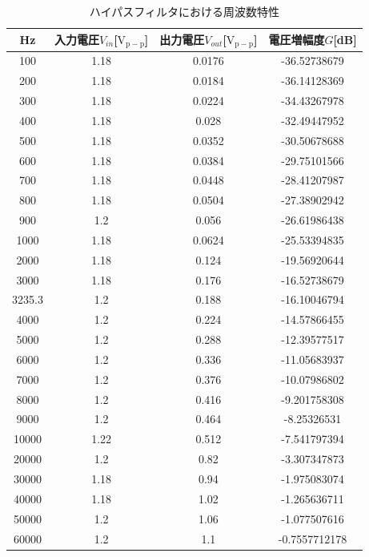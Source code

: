 \documentclass[a4paper,11pt,uplatex]{jsarticle}
\begin{document}
\begin{table}[H]
	\caption{ハイパスフィルタにおける周波数特性}
	\label{ハイパス特性}
	\begin{center}
    \begin{tabular}[H]{|c|c|c|c|}\hline
      Hz & 入力電圧$V_{in}$[$\mathrm{V_{p-p}}$] & 出力電圧$V_{out}$[$\mathrm{V_{p-p}}$] & 電圧増幅度$G$[dB]  \\ \hline
      100 & 1.18 & 0.0176 & -36.52738679 \\ \hline
      200 & 1.18 & 0.0184 & -36.14128369 \\ \hline
      300 & 1.18 & 0.0224 & -34.43267978 \\ \hline
      400 & 1.18 & 0.028 & -32.49447952 \\ \hline
      500 & 1.18 & 0.0352 & -30.50678688 \\ \hline
      600 & 1.18 & 0.0384 & -29.75101566 \\ \hline
      700 & 1.18 & 0.0448 & -28.41207987 \\ \hline
      800 & 1.18 & 0.0504 & -27.38902942 \\ \hline
      900 & 1.2 & 0.056 & -26.61986438 \\ \hline
      1000 & 1.18 & 0.0624 & -25.53394835 \\ \hline
      2000 & 1.18 & 0.124 & -19.56920644 \\ \hline
      3000 & 1.18 & 0.176 & -16.52738679 \\ \hline
      3235.3 & 1.2 & 0.188 & -16.10046794 \\ \hline
      4000 & 1.2 & 0.224 & -14.57866455 \\ \hline
      5000 & 1.2 & 0.288 & -12.39577517 \\ \hline
      6000 & 1.2 & 0.336 & -11.05683937 \\ \hline
      7000 & 1.2 & 0.376 & -10.07986802 \\ \hline
      8000 & 1.2 & 0.416 & -9.201758308 \\ \hline
      9000 & 1.2 & 0.464 & -8.25326531 \\ \hline
      10000 & 1.22 & 0.512 & -7.541797394 \\ \hline
      20000 & 1.2 & 0.82 & -3.307347873 \\ \hline
      30000 & 1.18 & 0.94 & -1.975083074 \\ \hline
      40000 & 1.18 & 1.02 & -1.265636711 \\ \hline
      50000 & 1.2 & 1.06 & -1.077507616 \\ \hline
      60000 & 1.2 & 1.1 & -0.7557712178 \\ \hline

\end{tabular}
\end{center}
\end{table}
\end{document}
